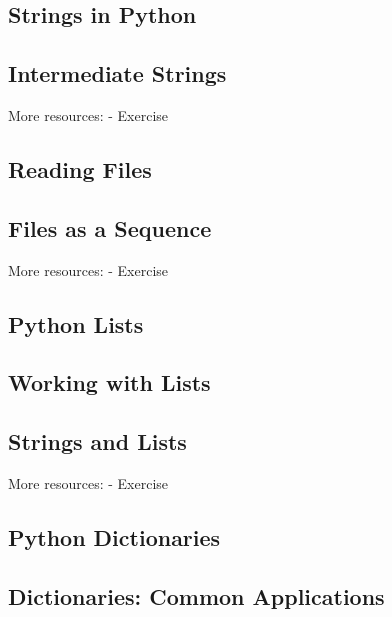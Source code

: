 \documentclass{article}%
\begin{document}
%
\subsection{Strings in Python}%
\label{subsec:StringsinPython}%

%
\subsection{Intermediate Strings}%
\label{subsec:IntermediateStrings}%
More resources:\newline%
{-} Exercise\newline%

%
\subsection{Reading Files}%
\label{subsec:ReadingFiles}%

%
\subsection{Files as a Sequence}%
\label{subsec:FilesasaSequence}%
More resources:\newline%
{-} Exercise\newline%

%
\subsection{Python Lists}%
\label{subsec:PythonLists}%

%
\subsection{Working with Lists}%
\label{subsec:WorkingwithLists}%

%
\subsection{Strings and Lists}%
\label{subsec:StringsandLists}%
More resources:\newline%
{-} Exercise\newline%

%
\subsection{Python Dictionaries}%
\label{subsec:PythonDictionaries}%

%
\subsection{Dictionaries: Common Applications}%
\label{subsec:DictionariesCommonApplications}%
\end{document}
